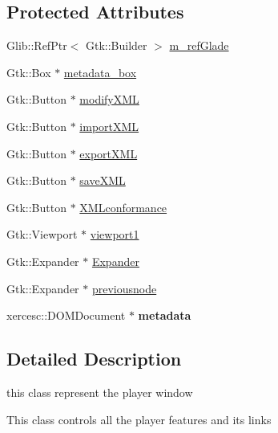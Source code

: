 \subsection*{Protected Attributes}
\begin{DoxyCompactItemize}
\item 
Glib\-::\-Ref\-Ptr$<$ Gtk\-::\-Builder $>$ \hyperlink{classmetadataWindow_aafbb917d9e593dbbea0619d87bb7be7a}{m\-\_\-ref\-Glade}
\item 
Gtk\-::\-Box $\ast$ \hyperlink{classmetadataWindow_a1b4bbe65be89497dfcccc1c6a25cdfe7}{metadata\-\_\-box}
\item 
Gtk\-::\-Button $\ast$ \hyperlink{classmetadataWindow_a6243706a8b1e55b9125f785af8bdf83b}{modify\-X\-M\-L}
\item 
Gtk\-::\-Button $\ast$ \hyperlink{classmetadataWindow_a2051e409ea2938b18915e3d8f978df56}{import\-X\-M\-L}
\item 
Gtk\-::\-Button $\ast$ \hyperlink{classmetadataWindow_ab381aa9da2c3ed515ef75a4d11cb25fb}{export\-X\-M\-L}
\item 
Gtk\-::\-Button $\ast$ \hyperlink{classmetadataWindow_ab38d435ed3b41749f31bd1b04fbc370a}{save\-X\-M\-L}
\item 
Gtk\-::\-Button $\ast$ \hyperlink{classmetadataWindow_ae95b4bc0b7741686138e6fcad39f05c2}{X\-M\-Lconformance}
\item 
Gtk\-::\-Viewport $\ast$ \hyperlink{classmetadataWindow_abcf0f3fc4cc9c73b68edbfef1d755a38}{viewport1}
\item 
Gtk\-::\-Expander $\ast$ \hyperlink{classmetadataWindow_a3895713778e334a6a35167c68d64e8da}{Expander}
\item 
Gtk\-::\-Expander $\ast$ \hyperlink{classmetadataWindow_a2455df9286c750582afdbcee85abc2ca}{previousnode}
\item 
\hypertarget{classmetadataWindow_a45d48d5da212ce96883a6c622dd81d0f}{xercesc\-::\-D\-O\-M\-Document $\ast$ {\bfseries metadata}}\label{classmetadataWindow_a45d48d5da212ce96883a6c622dd81d0f}

\end{DoxyCompactItemize}


\subsection{Detailed Description}
this class represent the player window 

This class controls all the player features and its links 

